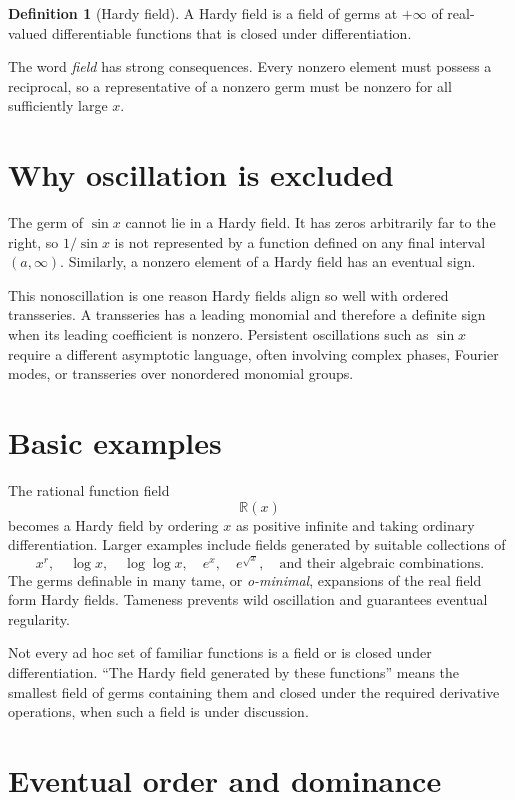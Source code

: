 \documentclass[11pt,openany]{book}
\theoremstyle{definition}
\newtheorem{definition}{Definition}[chapter]
\theoremstyle{plain}
\theoremstyle{remark}
\newcommand{\R}{\mathbb{R}}
\begin{document}
\begin{definition}[Hardy field]
A Hardy field is a field of germs at $+\infty$ of real-valued differentiable functions that is closed under differentiation.
\end{definition}

The word \emph{field} has strong consequences. Every nonzero element must possess a reciprocal, so a representative of a nonzero germ must be nonzero for all sufficiently large $x$.

\section{Why oscillation is excluded}

The germ of $\sin x$ cannot lie in a Hardy field. It has zeros arbitrarily far to the right, so $1/\sin x$ is not represented by a function defined on any final interval $(a,\infty)$. Similarly, a nonzero element of a Hardy field has an eventual sign.

This nonoscillation is one reason Hardy fields align so well with ordered transseries. A transseries has a leading monomial and therefore a definite sign when its leading coefficient is nonzero. Persistent oscillations such as $\sin x$ require a different asymptotic language, often involving complex phases, Fourier modes, or transseries over nonordered monomial groups.

\section{Basic examples}

The rational function field
\[
 \R(x)
\]
becomes a Hardy field by ordering $x$ as positive infinite and taking ordinary differentiation. Larger examples include fields generated by suitable collections of
\[
 x^r,\quad \log x,\quad \log\log x,\quad e^x,
 \quad e^{\sqrt{x}},\quad \text{and their algebraic combinations}.
\]
The germs definable in many tame, or \emph{o-minimal}, expansions of the real field form Hardy fields. Tameness prevents wild oscillation and guarantees eventual regularity.

Not every ad hoc set of familiar functions is a field or is closed under differentiation. ``The Hardy field generated by these functions'' means the smallest field of germs containing them and closed under the required derivative operations, when such a field is under discussion.

\section{Eventual order and dominance}
\end{document}
